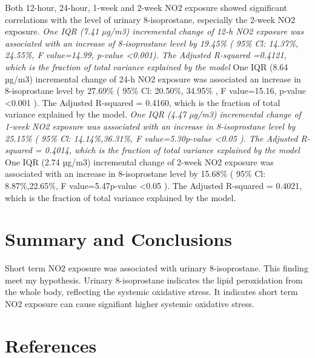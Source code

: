 \documentclass[12pt,]{article}
\begin{document}
Both 12-hour, 24-hour, 1-week and 2-week NO2 exposure showed significant
correlations with the level of urinary 8-isoprostane, especially the
2-week NO2 exposure. \emph{One IQR (7.41 µg/m3) incremental change of
12-h NO2 exposure was associated with an increase of 8-isoprostane level
by 19.45\% ( 95\% Cl: 14.37\%, 24.55\%, F value=14.99, p-value
\textless0.001). The Adjusted R-squared =0.4121, which is the fraction
of total variance explained by the model }One IQR (8.64 µg/m3)
incremental change of 24-h NO2 exposure was associated an increase in
8-isoprostane level by 27.69\% ( 95\% Cl: 20.50\%, 34.95\% , F
value=15.16, p-value \textless0.001 ). The Adjusted R-squared = 0.4160,
which is the fraction of total variance explained by the model.
\emph{One IQR (4.47 µg/m3) incremental change of 1-week NO2 exposure was
associated with an increase in 8-isoprostane level by 25.15\% ( 95\% Cl:
14.14\%,36.31\%, F value=5.30p-value \textless0.05 ). The Adjusted
R-squared = 0.4014, which is the fraction of total variance explained by
the model }One IQR (2.74 µg/m3) incremental change of 2-week NO2
exposure was associated with an increase in 8-isoprostane level by
15.68\% ( 95\% Cl: 8.87\%,22.65\%, F value=5.47p-value \textless0.05 ).
The Adjusted R-squared = 0.4021, which is the fraction of total variance
explained by the model.

\hypertarget{summary-and-conclusions}{%
\section{Summary and Conclusions}\label{summary-and-conclusions}}

Short term NO2 exposure was associated with urinary 8-isoprostane. This
finding meet my hypothesis. Urinary 8-isoprostane indicates the lipid
peroxidation from the whole body, reflecting the systemic oxidative
stress. It indicates short term NO2 exposure can cause signifiant higher
systemic oxidative stress.

\newpage

\hypertarget{references}{%
\section{References}\label{references}}
\end{document}
